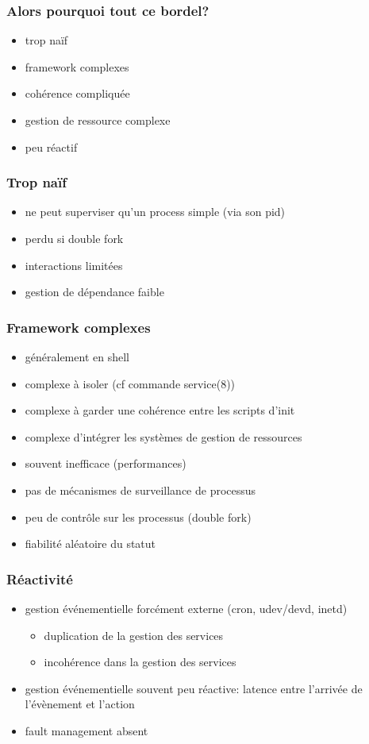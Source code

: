\begin{frame}
	\frametitle{Alors pourquoi tout ce bordel?}
	\begin{itemize}
			\pause
		\item trop naïf
			\pause
		\item framework complexes
			\pause
		\item cohérence compliquée
			\pause
		\item gestion de ressource complexe
			\pause
		\item peu réactif
	\end{itemize}
\end{frame}

\begin{frame}
	\frametitle{Trop naïf}
	\begin{itemize}
			\pause
		\item ne peut superviser qu'un process simple (via son pid)
			\pause
		\item perdu si double fork
			\pause
		\item interactions limitées
			\pause
		\item gestion de dépendance faible
	\end{itemize}
\end{frame}

\begin{frame}
	\frametitle{Framework complexes}
	\begin{itemize}
			\pause
		\item généralement en shell
			\pause
		\item complexe à isoler (cf commande service(8))
			\pause
		\item complexe à garder une cohérence entre les scripts d'init
			\pause
		\item complexe d'intégrer les systèmes de gestion de ressources
			\pause
		\item souvent inefficace (performances)
			\pause
		\item pas de mécanismes de surveillance de processus
			\pause
		\item peu de contrôle sur les processus (double fork)
			\pause
		\item fiabilité aléatoire du statut
	\end{itemize}
\end{frame}

\begin{frame}
	\frametitle{Réactivité}
	\begin{itemize}
			\pause
		\item gestion événementielle forcément externe (cron, udev/devd, inetd)
			\pause
			\begin{itemize}
				\item duplication de la gestion des services
				\item incohérence dans la gestion des services
			\end{itemize}
			\pause
		\item gestion événementielle souvent peu réactive: latence entre l'arrivée de l'évènement et l'action
			\pause
		\item fault management absent
	\end{itemize}
\end{frame}

